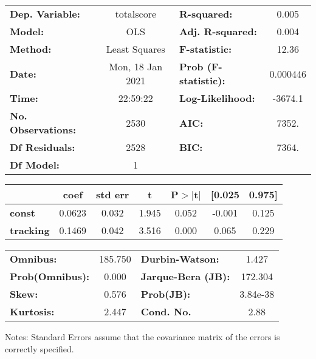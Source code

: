 \begin{center}
\begin{tabular}{lclc}
\toprule
\textbf{Dep. Variable:}    &    totalscore    & \textbf{  R-squared:         } &     0.005   \\
\textbf{Model:}            &       OLS        & \textbf{  Adj. R-squared:    } &     0.004   \\
\textbf{Method:}           &  Least Squares   & \textbf{  F-statistic:       } &     12.36   \\
\textbf{Date:}             & Mon, 18 Jan 2021 & \textbf{  Prob (F-statistic):} &  0.000446   \\
\textbf{Time:}             &     22:59:22     & \textbf{  Log-Likelihood:    } &   -3674.1   \\
\textbf{No. Observations:} &        2530      & \textbf{  AIC:               } &     7352.   \\
\textbf{Df Residuals:}     &        2528      & \textbf{  BIC:               } &     7364.   \\
\textbf{Df Model:}         &           1      & \textbf{                     } &             \\
\bottomrule
\end{tabular}
\begin{tabular}{lcccccc}
                  & \textbf{coef} & \textbf{std err} & \textbf{t} & \textbf{P$> |$t$|$} & \textbf{[0.025} & \textbf{0.975]}  \\
\midrule
\textbf{const}    &       0.0623  &        0.032     &     1.945  &         0.052        &       -0.001    &        0.125     \\
\textbf{tracking} &       0.1469  &        0.042     &     3.516  &         0.000        &        0.065    &        0.229     \\
\bottomrule
\end{tabular}
\begin{tabular}{lclc}
\textbf{Omnibus:}       & 185.750 & \textbf{  Durbin-Watson:     } &    1.427  \\
\textbf{Prob(Omnibus):} &   0.000 & \textbf{  Jarque-Bera (JB):  } &  172.304  \\
\textbf{Skew:}          &   0.576 & \textbf{  Prob(JB):          } & 3.84e-38  \\
\textbf{Kurtosis:}      &   2.447 & \textbf{  Cond. No.          } &     2.88  \\
\bottomrule
\end{tabular}
\end{center}

Notes: \newline
 [1] Standard Errors assume that the covariance matrix of the errors is correctly specified.
